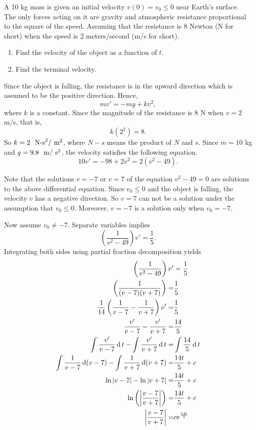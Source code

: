 \begin{example}
  A 10 kg mass is given an initial velocity $v(0)=v_0\le 0$ near Earth’s surface. The only forces acting on it are gravity and atmospheric resistance proportional to the square of the speed. Assuming that the resistance is 8 Newton (N for short) when the speed is 2 meters/second (m/s for short).
  \begin{enumerate}
    \item Find the velocity of the object as a function of $t$.
    \item Find the terminal velocity.
  \end{enumerate}
\end{example}
\begin{solution}
Since the object is falling, the resistance is in the upward direction which is assumed to be the positive direction. Hence,
\[mv'=-mg+kv^2,\]
where $k$ is a constant. Since the magnitude of the resistance is 8 N when $v=2$ m/s, that is,
\[k(2^2)=8.\]
So $k=2\ \textup{ N-s}^2/\textup{ m}^2$, where $N-s$ means the product of $N$ and $s$. Since $m=10$ kg and $g=9.8 ~ \textup{ m}/\textup{ s}^2$, the velocity satisfies the following equation.
\[10v'=-98+2v^2=2(v^2-49).\]

Note that the solutions $v=-7$ or $v=7$ of the equation $v^2-49=0$ are solutions to the above differential equation. Since $v_0\le 0$ and the object is falling, the velocity $v$ has a negative direction. So $v=7$ can not be a solution under the assumption that $v_0\le 0$. Moreover, $v=-7$ is a solution only when $v_0=-7$.

Now assume $v_0\ne-7$. Separate variables implies
\[\left(\frac{1}{v^2-49}\right)v'=\frac{1}{5}.\]
Integrating both sides using partial fraction decomposition yields
\[
\begin{aligned}
  \left(\frac{1}{v^2-49}\right)v'&=\frac15\\
  \left(\frac{1}{(v-7)(v+7)}\right)=&\frac15\\
  \frac{1}{14}\left(\frac{1}{v-7} - \frac{1}{v+7}\right)v'=&\frac15\\
  \frac{v'}{v-7}-\frac{v'}{v+7}=&\frac{14}{5}\\
  \int\frac{v'}{v-7}\operatorname{d} t-\int\frac{v'}{v+7}\operatorname{d} t=&\int\frac{14}{5}\operatorname{d} t\\
  \int\frac{1}{v-7}\operatorname{d}(v-7)-\int\frac{1}{v+7}\operatorname{d}(v+7)=&\frac{14t}{5}+c\\
  \ln|v-7|-\ln|v+7|=&\frac{14t}{5}+c\\
  \ln\left(\left|\frac{v-7}{v+7}\right|\right)=&\frac{14t}{5}+c\\
  \left|\frac{v-7}{v+7}\right|=&ce^{\frac{14t}{5}}
\end{aligned}  
\]


\end{solution}
